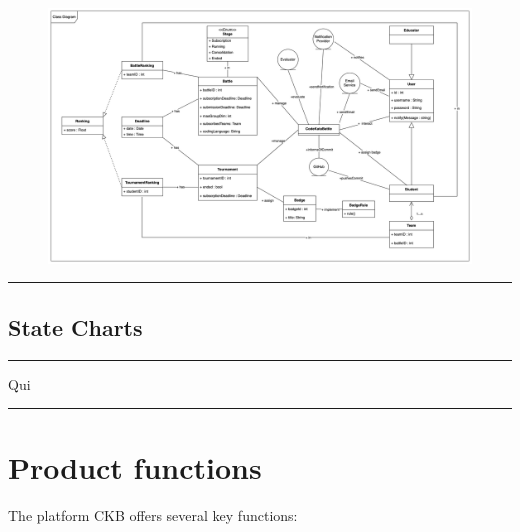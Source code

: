\documentclass{Configuration_Files/Template}
\begin{document}
\begin{figure}[H]
\includegraphics[scale = 0.45]{Images/ClassDiagram/ClassDiagram.png}\\
\centering
\end{figure}

{\color{bluepoli}\rule{\linewidth}{0.1pt}}

\subsection{State Charts}

{\color{bluepoli}\rule{\linewidth}{0.1pt}}
Qui\\
{\color{bluepoli}\rule{\linewidth}{0.1pt}}

\section{Product functions}

The platform CKB offers several key functions:
\end{document}
